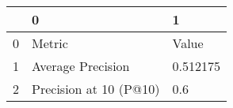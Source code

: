 \begin{tabular}{lll}
\toprule
{} &                       0 &         1 \\
\midrule
0 &                  Metric &     Value \\
1 &       Average Precision &  0.512175 \\
2 &  Precision at 10 (P@10) &       0.6 \\
\bottomrule
\end{tabular}
